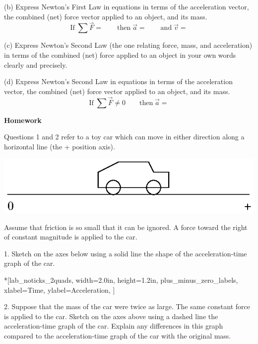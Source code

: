 (b) Express Newton's First Law in equations in terms of the acceleration vector,
the combined (net) force vector applied to an object, and its mass.
\[
\mbox{If}\; \sum {\vec F}= \qquad \mbox{then}\; {\vec a}=
\qquad \mbox{and}\; {\vec v}=\]


(c) Express Newton's Second Law (the one relating force, mass, and acceleration)
in terms of the combined (net) force applied to an object in your own words
clearly and precisely.
\vspace{20mm}

(d) Express Newton's Second Law in equations in terms of the acceleration vector,
the combined (net) force vector applied to an object, and its mass.
\[
\mbox{If}\; \sum {\vec F}\neq 0\qquad \mbox{then}\; 
{\vec a}=\]


\textbf{Homework} 

Questions 1 and 2 refer to a toy car which can move in either direction along
a horizontal line (the + position axis).

{\par\centering \includegraphics{force2/force2_fig6.eps} \par}

Assume that friction is so small that it can be ignored. A force toward the
right of constant magnitude is applied to the car. 

1. Sketch on the axes below using a solid line the shape of the acceleration-time
graph of the car.

\begin{lab_axis}*[lab_noticks_2quads,
	width=2.0in,  height=1.2in,
	plus_minus_zero_labels,
	xlabel=Time,
	ylabel=Acceleration,
	]
\end{lab_axis}

2. Suppose that the mass of the car were twice as large. The same constant force
is applied to the car. Sketch on the axes above using a dashed line the acceleration-time
graph of the car. Explain any differences in this graph compared to the acceleration-time
graph of the car with the original mass.
\answerspace{10mm}


